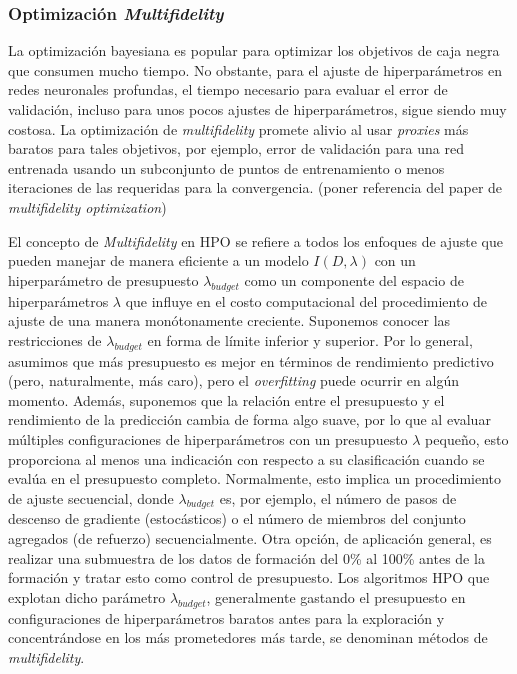 \subsubsection{Optimización \textit{Multifidelity}}



La optimización bayesiana es popular para optimizar los objetivos de caja negra que consumen mucho tiempo. No obstante, para el ajuste de hiperparámetros en redes neuronales profundas, el tiempo necesario para evaluar el error de validación, incluso para unos pocos ajustes de hiperparámetros, sigue siendo muy costosa. La optimización de \textit{multifidelity} promete alivio al usar \emph{proxies} más baratos para tales objetivos, por ejemplo, error de validación para una red entrenada usando un subconjunto de puntos de entrenamiento o menos iteraciones de las requeridas para la convergencia. (poner referencia del paper de \textit{multifidelity optimization})

El concepto de \textit{Multifidelity} en HPO se refiere a todos los enfoques de ajuste que pueden manejar de manera eficiente a un modelo $I(D, \lambda)$ con un hiperparámetro de presupuesto $\lambda_{budget}$ como un componente del espacio de hiperparámetros $\lambda$ que influye en el costo computacional del procedimiento de ajuste de una manera monótonamente creciente. Suponemos conocer las restricciones de $\lambda_{budget}$ en forma de límite inferior y superior. Por lo general, asumimos que más presupuesto es mejor en términos de rendimiento predictivo (pero, naturalmente, más caro), pero el \textit{overfitting} puede ocurrir en algún momento. Además, suponemos que la relación entre el presupuesto y el rendimiento de la predicción cambia de forma algo suave, por lo que al evaluar múltiples configuraciones de hiperparámetros con un presupuesto $\lambda$ pequeño, esto proporciona al menos una indicación con respecto a su clasificación cuando se evalúa en el presupuesto completo. Normalmente, esto implica un procedimiento de ajuste secuencial, donde $\lambda_{budget}$ es, por ejemplo,  el número de pasos de descenso de gradiente (estocásticos) o el número de miembros del conjunto agregados (de refuerzo) secuencialmente. Otra opción, de aplicación general, es realizar una submuestra de los datos de formación del 0\% al 100\% antes de la formación y tratar esto como control de presupuesto. Los algoritmos HPO que explotan dicho parámetro $\lambda_{budget}$, generalmente gastando el presupuesto en configuraciones de hiperparámetros baratos antes para la exploración y concentrándose en los más prometedores más tarde, se denominan métodos de \textit{multifidelity}.

